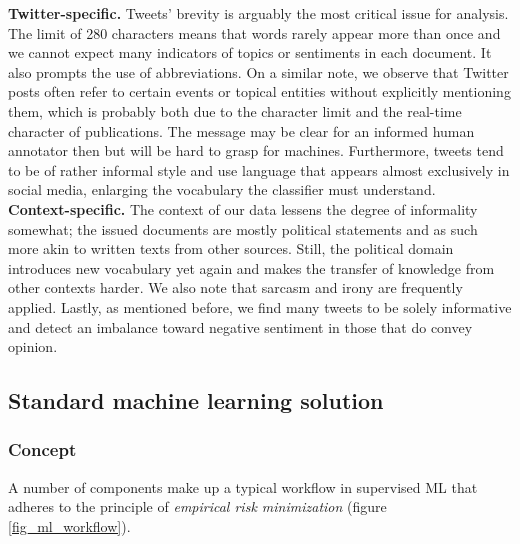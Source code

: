 \textbf{Twitter-specific.}
Tweets' brevity is arguably the most critical issue for analysis.
The limit of 280 characters means that words rarely appear more than once and 
we cannot expect many indicators of topics or sentiments in each document.
It also prompts the use of abbreviations.
On a similar note, we observe that Twitter posts often refer to certain events 
or topical entities without explicitly mentioning them, which is probably both 
due to the character limit and the real-time character of publications.
The message may be clear for an informed human annotator then but will be hard 
to grasp for machines.
Furthermore, tweets tend to be of rather informal style and use language that 
appears almost exclusively in social media, enlarging the vocabulary the 
classifier must understand.
\\

\textbf{Context-specific.}
The context of our data lessens the degree of informality somewhat; the issued 
documents are mostly political statements and as such more akin to written 
texts from other sources.
Still, the political domain introduces new vocabulary yet again and makes the 
transfer of knowledge from other contexts harder.
We also note that sarcasm and irony are frequently applied. 
Lastly, as mentioned before, we find many tweets to be solely informative and 
detect an imbalance toward negative sentiment in those that do convey opinion.


\subsection{Standard machine learning solution}
\label{tssa_ml}


\subsubsection{Concept}
\label{tssa_ml_concept}

A number of components make up a typical workflow in supervised ML that adheres 
to the principle of \textit{empirical risk minimization}
(figure \ref{fig_ml_workflow}).

\vspace{0.3cm}

